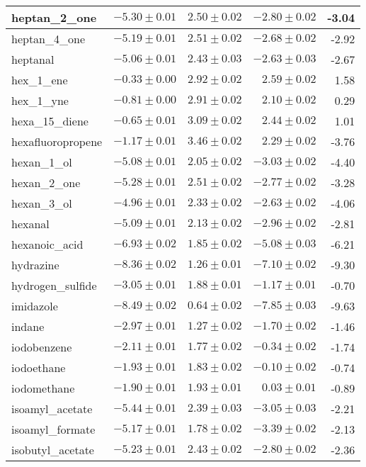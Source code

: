 \begin{longtable}{| l | r  | r   | r | r |}
heptan\_2\_one & $-5.30\pm 0.01 $ & $2.50\pm0.02$  &  $-2.80\pm0.02 $ & -3.04\\\hline
heptan\_4\_one & $-5.19\pm 0.01 $ & $2.51\pm0.02$  &  $-2.68\pm0.02 $ & -2.92\\\hline
heptanal & $-5.06\pm 0.01 $ & $2.43\pm0.03$  &  $-2.63\pm0.03 $ & -2.67\\\hline
hex\_1\_ene & $-0.33\pm 0.00 $ & $2.92\pm0.02$  &  $2.59\pm0.02 $ & 1.58\\\hline
hex\_1\_yne & $-0.81\pm 0.00 $ & $2.91\pm0.02$  &  $2.10\pm0.02 $ & 0.29\\\hline
hexa\_15\_diene & $-0.65\pm 0.01 $ & $3.09\pm0.02$  &  $2.44\pm0.02 $ & 1.01\\\hline
hexafluoropropene & $-1.17\pm 0.01 $ & $3.46\pm0.02$  &  $2.29\pm0.02 $ & -3.76\\\hline
hexan\_1\_ol & $-5.08\pm 0.01 $ & $2.05\pm0.02$  &  $-3.03\pm0.02 $ & -4.40\\\hline
hexan\_2\_one & $-5.28\pm 0.01 $ & $2.51\pm0.02$  &  $-2.77\pm0.02 $ & -3.28\\\hline
hexan\_3\_ol & $-4.96\pm 0.01 $ & $2.33\pm0.02$  &  $-2.63\pm0.02 $ & -4.06\\\hline
hexanal & $-5.09\pm 0.01 $ & $2.13\pm0.02$  &  $-2.96\pm0.02 $ & -2.81\\\hline
hexanoic\_acid & $-6.93\pm 0.02 $ & $1.85\pm0.02$  &  $-5.08\pm0.03 $ & -6.21\\\hline
hydrazine & $-8.36\pm 0.02 $ & $1.26\pm0.01$  &  $-7.10\pm0.02 $ & -9.30\\\hline
hydrogen\_sulfide & $-3.05\pm 0.01 $ & $1.88\pm0.01$  &  $-1.17\pm0.01 $ & -0.70\\\hline
imidazole & $-8.49\pm 0.02 $ & $0.64\pm0.02$  &  $-7.85\pm0.03 $ & -9.63\\\hline
indane & $-2.97\pm 0.01 $ & $1.27\pm0.02$  &  $-1.70\pm0.02 $ & -1.46\\\hline
iodobenzene & $-2.11\pm 0.01 $ & $1.77\pm0.02$  &  $-0.34\pm0.02 $ & -1.74\\\hline
iodoethane & $-1.93\pm 0.01 $ & $1.83\pm0.02$  &  $-0.10\pm0.02 $ & -0.74\\\hline
iodomethane & $-1.90\pm 0.01 $ & $1.93\pm0.01$  &  $0.03\pm0.01 $ & -0.89\\\hline
isoamyl\_acetate & $-5.44\pm 0.01 $ & $2.39\pm0.03$  &  $-3.05\pm0.03 $ & -2.21\\\hline
isoamyl\_formate & $-5.17\pm 0.01 $ & $1.78\pm0.02$  &  $-3.39\pm0.02 $ & -2.13\\\hline
isobutyl\_acetate & $-5.23\pm 0.01 $ & $2.43\pm0.02$  &  $-2.80\pm0.02 $ & -2.36\\\hline

\end{longtable}
